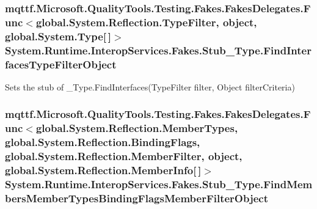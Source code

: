 \hypertarget{class_system_1_1_runtime_1_1_interop_services_1_1_fakes_1_1_stub___type_ae2c0d58388542abd8e34b970d1a0e5bf}{
\subsubsection[{Find\-Interfaces\-Type\-Filter\-Object}]{\setlength{\rightskip}{0pt plus 5cm}mqttf.\-Microsoft.\-Quality\-Tools.\-Testing.\-Fakes.\-Fakes\-Delegates.\-Func$<$global.\-System.\-Reflection.\-Type\-Filter, object, global.\-System.\-Type\mbox{[}$\,$\mbox{]}$>$ System.\-Runtime.\-Interop\-Services.\-Fakes.\-Stub\-\_\-\-Type.\-Find\-Interfaces\-Type\-Filter\-Object}}\label{class_system_1_1_runtime_1_1_interop_services_1_1_fakes_1_1_stub___type_ae2c0d58388542abd8e34b970d1a0e5bf}


Sets the stub of \-\_\-\-Type.\-Find\-Interfaces(\-Type\-Filter filter, Object filter\-Criteria)

\hypertarget{class_system_1_1_runtime_1_1_interop_services_1_1_fakes_1_1_stub___type_ad1a13a1a31db5b6db77dce4c8771c203}{
\subsubsection[{Find\-Members\-Member\-Types\-Binding\-Flags\-Member\-Filter\-Object}]{\setlength{\rightskip}{0pt plus 5cm}mqttf.\-Microsoft.\-Quality\-Tools.\-Testing.\-Fakes.\-Fakes\-Delegates.\-Func$<$global.\-System.\-Reflection.\-Member\-Types, global.\-System.\-Reflection.\-Binding\-Flags, global.\-System.\-Reflection.\-Member\-Filter, object, global.\-System.\-Reflection.\-Member\-Info\mbox{[}$\,$\mbox{]}$>$ System.\-Runtime.\-Interop\-Services.\-Fakes.\-Stub\-\_\-\-Type.\-Find\-Members\-Member\-Types\-Binding\-Flags\-Member\-Filter\-Object}}\label{class_system_1_1_runtime_1_1_interop_services_1_1_fakes_1_1_stub___type_ad1a13a1a31db5b6db77dce4c8771c203}


